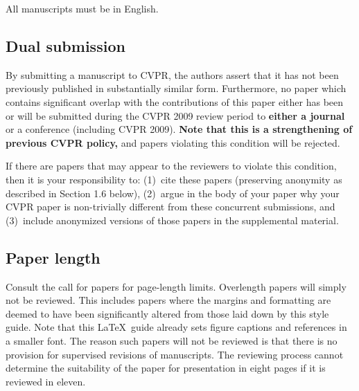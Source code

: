 \documentclass[10pt,twocolumn,letterpaper]{article}
\begin{document}
All manuscripts must be in English.

\subsection{Dual submission}

By submitting a manuscript to CVPR, the authors assert that it has not been
previously published in substantially similar form. Furthermore, no paper which
contains significant overlap with the contributions of this paper either has
 been or will be submitted during the CVPR 2009 review period to {\bf either
a journal} or a conference (including CVPR 2009).
{\bf Note that this is a strengthening of previous CVPR policy,}
and papers violating this condition will be rejected.

If there are papers that may appear to the reviewers
to violate this condition, then it is your responsibility to: (1)~cite
these papers (preserving anonymity as described in Section 1.6 below),
(2)~argue in the body of your paper why your CVPR paper is non-trivially
different from these concurrent submissions, and (3)~include anonymized
versions of those papers in the supplemental material.


\subsection{Paper length}
Consult the call for papers for page-length limits.  Overlength papers will
simply not be reviewed.  This includes papers where the margins and
formatting are deemed to have been significantly altered from those laid
down by this style guide.  Note that this \LaTeX\ guide already sets figure
captions and references in a smaller font.  The reason such papers will not
be reviewed is that there is no provision for supervised revisions of
manuscripts.  The reviewing process cannot determine the suitability of the
paper for presentation in eight pages if it is reviewed in eleven.
\end{document}
